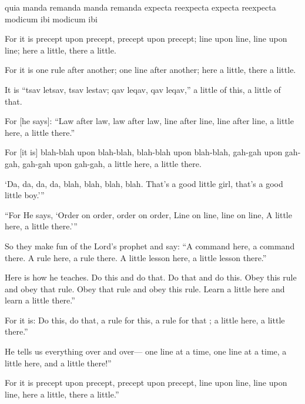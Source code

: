 			\begin{framed}
			\scriptsize
				\begin{compactdesc}
					\item[BHS] 
					\item[LXX] 
					\item[BSV] quia manda remanda manda remanda expecta reexpecta expecta reexpecta modicum ibi modicum ibi
					\item[ASV] For it is precept upon precept, precept upon precept; line upon line, line upon line; here a little, there a little.
					\item[BBE] For it is one rule after another; one line after another; here a little, there a little.
					\item[CEB] It is ``tsav letsav, tsav lestav; qav leqav, qav leqav,'' a little of this, a little of that.
					\item[HCSB] For [he says]: ``Law after law, law after law, line after line, line after line, a little here, a little there.''
					\item[LEB] For [it is] blah-blah upon blah-blah, blah-blah upon blah-blah, gah-gah upon gah-gah, gah-gah upon gah-gah, a little here, a little there.
					\item[TMB] `Da, da, da, da, blah, blah, blah, blah. That's a good little girl, that's a good little boy.'''
					\item[NASB] ``For He says, `Order on order, order on order, Line on line, line on line, A little here, a little there.'''
					\item[NCV] So they make fun of the Lord's prophet and say: ``A command here, a command there. A rule here, a rule there. A little lesson here, a little lesson there.''
					\item[NIRV] Here is how he teaches. Do this and do that. Do that and do this. Obey this rule and obey that rule. Obey that rule and obey this rule. Learn a little here and learn a little there.''
					\item[NIV] For it is: Do this, do that, a rule for this, a rule for that ; a little here, a little there.''
					\item[NLT] He tells us everything over and over--- one line at a time, one line at a time, a little here, and a little there!''
					\item[NRSV] For it is precept upon precept, precept upon precept, line upon line, line upon line, here a little, there a little.''

\end{compactdesc}
\end{framed}
